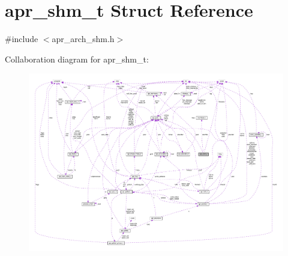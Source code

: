 \hypertarget{structapr__shm__t}{}\section{apr\+\_\+shm\+\_\+t Struct Reference}
\label{structapr__shm__t}


{\ttfamily \#include $<$apr\+\_\+arch\+\_\+shm.\+h$>$}



Collaboration diagram for apr\+\_\+shm\+\_\+t\+:
\nopagebreak
\begin{figure}[H]
\begin{center}
\leavevmode
\includegraphics[width=350pt]{structapr__shm__t__coll__graph}
\end{center}
\end{figure}
